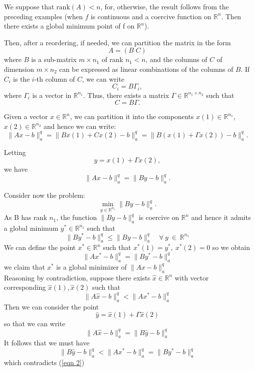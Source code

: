 \documentclass{ExerciseSheet}
\begin{document}
\begin{solution}
We suppose that $\mathrm{rank}(A) < n$, for, otherwise, the result follows from the preceding examples (when $f$ is continuous and a coercive function on $\mathbb{R}^n$. Then there exists a global minimum
point of f on $\mathbb{R}^n$).

Then, after a reordering, if needed, we can partition the matrix in the form
\[
A = (B \; C)
\]
where $B$ is a sub-matrix $m \times n_1$ of rank $n_1 < n$, and the columns of $C$ of dimension $m \times n_2$ can be expressed as linear combinations of the columns of $B$. If $C_i$ is the $i$-th column of $C$, we can write
\[
C_i = B \Gamma_i,
\]
where $\Gamma_i$ is a vector in $\mathbb{R}^{n_1}$. Thus, there exists a matrix $\Gamma \in \mathbb{R}^{n_1 \times n_2}$ such that
\[
C = B \Gamma.
\]

Given a vector $x \in \mathbb{R}^n$, we can partition it into the components $x(1) \in \mathbb{R}^{n_1}$, $x(2) \in \mathbb{R}^{n_2}$ and hence we can write:
\[
\|Ax - b\|_a^q = \|B x(1) + C x(2) - b\|_a^q = \|B (x(1) + \Gamma x(2)) - b\|_a^q.
\]

Letting
\[
y = x(1) + \Gamma x(2),
\]
we have
\[
\|Ax - b\|_a^q = \|By - b\|_a^q.
\]

Consider now the problem:
\begin{equation}
    \min_{y \in \mathbb{R}^{n_1}} \|By - b\|_a^q.
\end{equation}
As B has rank $n_1$, the function $\|By - b\|_a^q$ is coercive on $\mathbb{R}^n$ and hence it admits a global minimum $y^* \in \mathbb{R}^{n_1}$ such that 
\begin{equation} \label{eqn 2}
    \|By^* - b\|_a^q \leq \|By - b\|_a^q \quad \forall \  y \ \in \ \mathbb{R}^{n_1}
\end{equation}
We can define the point $x^* \in \mathbb{R}^n$ such that $x^*(1) = y^*, \ x^*(2) = 0 $ so we obtain
\begin{equation}
    \|Ax^* - b\|_a^q = \|By^* - b\|_a^q
\end{equation}
we claim that $x^*$ is a global minimizer of $\|Ax - b\|_a^q$\\

Reasoning by contradiction, suppose there exists $\hat{x}\in \mathbb{R}^n$ with vector corresponding $\hat{x}(1), \hat{x}(2)$ such that 
\begin{equation}
    \|A\hat{x} - b\|_a^q < \|Ax^* - b\|_a^q 
\end{equation}
Then we can consider the point 
$$\hat{y} = \hat{x}(1) + \Gamma \hat{x}(2)$$
so that we can write 
$$ \|A\hat{x} - b\|_a^q = \|B\hat{y} - b\|_a^q $$
It follows that we must have 
$$\|B\hat{y} - b\|_a^q  < \|Ax^* - b\|_a^q = \|By^* - b\|_a^q$$
which contradicts (\ref{eqn 2})
\end{solution}
\end{document}
